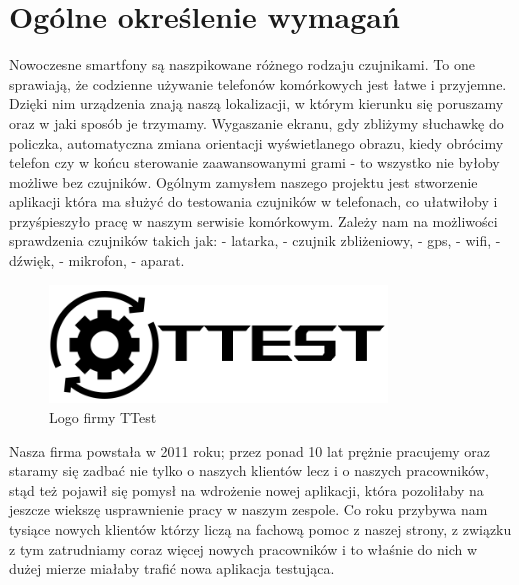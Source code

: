 \section{Ogólne określenie wymagań}		%

\hspace{0.60cm}Nowoczesne smartfony są naszpikowane różnego rodzaju czujnikami. To one sprawiają, że codzienne używanie telefonów komórkowych jest łatwe i przyjemne. Dzięki nim urządzenia znają naszą lokalizacji, w którym kierunku się poruszamy oraz w jaki sposób je trzymamy. Wygaszanie ekranu, gdy zbliżymy słuchawkę do policzka, automatyczna zmiana orientacji wyświetlanego obrazu, kiedy obrócimy telefon czy
w końcu sterowanie zaawansowanymi grami - to wszystko nie byłoby możliwe bez czujników. Ogólnym zamysłem naszego projektu jest stworzenie aplikacji która ma służyć do testowania czujników w telefonach, co ułatwiłoby i przyśpieszyło pracę w naszym serwisie komórkowym. \newline 
Zależy nam na możliwości sprawdzenia czujników takich jak: \newline
- latarka, \newline 
- czujnik zbliżeniowy, \newline
- gps, \newline
- wifi, \newline
- dźwięk, \newline
- mikrofon, \newline
- aparat.\newline

\begin{figure}[!hbt]
	\begin{center}
		\includegraphics[angle=360, width=0.80\textwidth]{rys/punkt1/logo_black.png}
		\caption{Logo firmy TTest}
		\label{rys:logo}
	\end{center}
\end{figure}

Nasza firma powstała w 2011 roku; przez ponad 10 lat prężnie pracujemy oraz staramy się zadbać nie tylko o naszych klientów lecz i o naszych pracowników, stąd też pojawił się pomysł na wdrożenie nowej aplikacji, która pozoliłaby na jeszcze wiekszę usprawnienie pracy w naszym zespole. Co roku przybywa nam tysiące nowych klientów którzy liczą na fachową pomoc z naszej strony, z związku z tym zatrudniamy coraz więcej nowych pracowników i to właśnie do nich w dużej mierze miałaby trafić nowa aplikacja testująca. 

